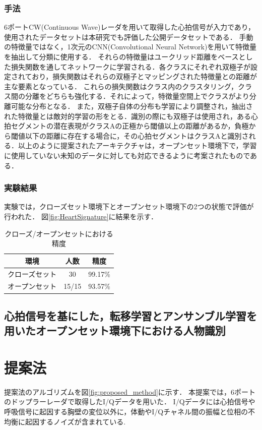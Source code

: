 \subsection{手法}
6ポートCW(Continuous Wave)レーダを用いて取得した心拍信号が入力であり，使用されたデータセットは本研究でも評価した公開データセットである．
手動の特徴量ではなく，1次元のCNN(Convolutional Neural Network)を用いて特徴量を抽出して分類に使用する．
それらの特徴量はユークリッド距離をベースとした損失関数を通してネットワークに学習される．各クラスにそれぞれ双極子が設定されており，損失関数はそれらの双極子とマッピングされた特徴量との距離が主な要素となっている．
これらの損失関数はクラス内のクラスタリング，クラス間の分離をどちらも強化する．それによって，特徴量空間上でクラスがより分離可能な分布となる．
また，双極子自体の分布も学習により調整され，抽出された特徴量とは敵対的学習の形をとる．識別の際にも双極子は使用され，ある心拍セグメントの潜在表現がクラスAの正極から閾値以上の距離があるか，負極から閾値以下の距離に存在する場合に，その心拍セグメントはクラスAと識別される．以上のように提案されたアーキテクチャは，オープンセット環境下で，学習に使用していない未知のデータに対しても対応できるように考案されたものである．

\subsection{実験結果}
実験では，クローズセット環境下とオープンセット環境下の2つの状態で評価が行われた．
図\ref{fig:HeartSignature}に結果を示す．

\begin{table}[H]
\caption{クローズ/オープンセットにおける精度}
\centering
\begin{tabular}{ccc}
\hline
環境 & 人数 & 精度 \\
\hline
クローズセット & 30 & 99.17\% \\
オープンセット & 15/15 & 93.57\% \\
\hline
\end{tabular}
\end{table}

\section{心拍信号を基にした，転移学習とアンサンブル学習を用いたオープンセット環境下における人物識別\cite{paper:Xing}}

\chapter{提案法}
提案法のアルゴリズムを図\ref{fig:proposed_method}に示す．
本提案では，6ポートのドップラーレーダで取得したI/Qデータを用いた．
I/Qデータには心拍信号や呼吸信号に起因する胸壁の変位以外に，体動やI/Qチャネル間の振幅と位相の不均衡に起因するノイズが含まれている.


